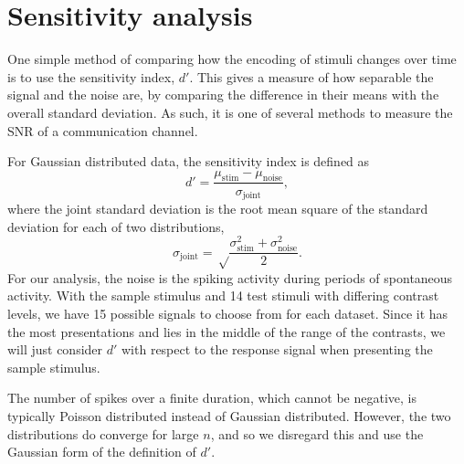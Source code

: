 \section{Sensitivity analysis}
\label{sec:pl_dprime}

One simple method of comparing how the encoding of stimuli changes over time is to use the sensitivity index, $d'$.
This gives a measure of how separable the signal and the noise are, by comparing the difference in their means with the overall standard deviation.
As such, it is one of several methods to measure the \ac{SNR} of a communication channel.

For Gaussian distributed data, the sensitivity index is defined as
\begin{equation}
\label{eq:dprime}
d' = \frac{\mu_\text{stim} - \mu_\text{noise}}{\sigma_\text{joint}}
,\end{equation}
where the joint standard deviation is the root mean square of the standard deviation for each of two distributions,
\begin{equation}
\sigma_\text{joint} = \sqrt \frac{\sigma_\text{stim}^2 + \sigma_\text{noise}^2}{2}
.\end{equation}
For our analysis, the noise is the spiking activity during periods of spontaneous activity.
With the sample stimulus and \num{14} test stimuli with differing contrast levels, we have \num{15} possible signals to choose from for each dataset.
Since it has the most presentations and lies in the middle of the range of the contrasts, we will just consider $d'$ with respect to the response signal when presenting the sample stimulus.

The number of spikes over a finite duration, which cannot be negative, is typically Poisson distributed instead of Gaussian distributed.
However, the two distributions do converge for large $n$, and so we disregard this and use the Gaussian form of the definition of $d'$.

